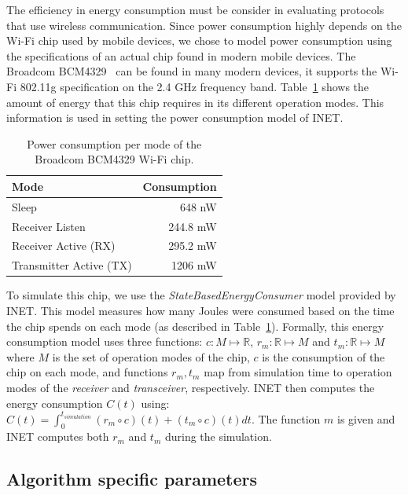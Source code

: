 The efficiency in energy consumption must be consider in evaluating protocols that use wireless communication.
%
Since power consumption highly depends on the Wi-Fi chip used by mobile devices, we chose to model power consumption using the specifications of an actual chip found in modern mobile devices.
%
The Broadcom BCM4329~\cite{BCM4329} can be found in many modern devices, it supports the Wi-Fi 802.11g specification on the 2.4 GHz frequency band.
%
Table~\ref{tbl:wifi-chip} shows the amount of energy that this chip requires in its different operation modes.
%
This information is used in setting the power consumption model of INET.

\begin{table}[ht]
	\footnotesize
	\centering
	
	\begin{tabular}{lr}
		\textbf{Mode} & \textbf{Consumption} \\
		
		\midrule
		Sleep  & 648 nW \\
		Receiver Listen & 244.8 mW \\
		Receiver Active (RX) & 295.2 mW \\
		Transmitter Active (TX) & 1206 mW \\
	\end{tabular}
	
	\caption{Power consumption per mode of the Broadcom BCM4329 Wi-Fi chip.}
	\label{tbl:wifi-chip}
\end{table}

To simulate this chip, we use the \textit{StateBasedEnergyConsumer} model provided by INET.
%
This model measures how many Joules were consumed based on the time the chip spends on each mode (as described in Table~\ref{tbl:wifi-chip}).
%
Formally, this energy consumption model uses three functions: $c : M \mapsto \mathbb{R} $, $r_m: \mathbb{R} \mapsto M$ and $t_m: \mathbb{R} \mapsto M$ where $M$ is the set of operation modes of the chip, $c$ is the consumption of the chip on each mode, and functions $r_m, t_m$ map from simulation time to operation modes of the \textit{receiver} and \textit{transceiver}, respectively.
%
INET then computes the energy consumption $C(t)$ using:  $C(t)=\int_{0}^{t_\textit{simulation}} (r_m \circ c) (t) + (t_m \circ c) (t) \textit{dt}$.
%
The function $m$ is given and INET computes both $r_m$ and $t_m$ during the simulation.



\subsection*{Algorithm specific parameters}

